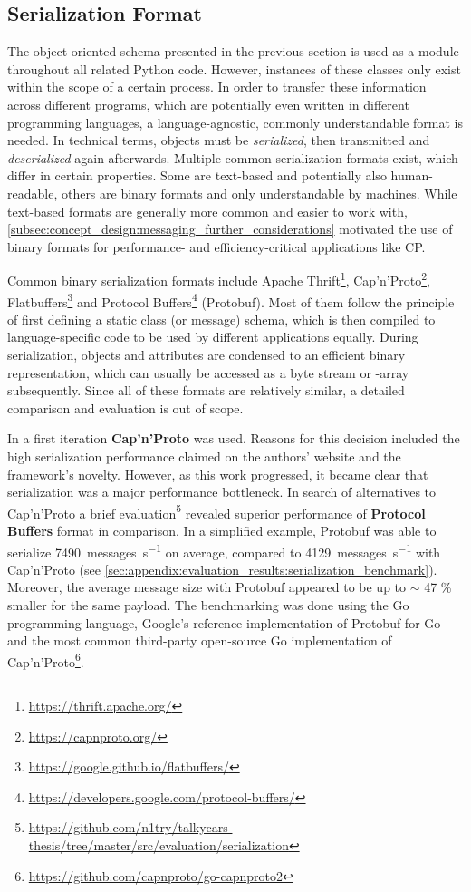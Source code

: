 \subsection{Serialization Format}
\label{subsec:implementation:serialization_format}
The object-oriented schema presented in the previous section is used as a module throughout all related Python code. However, instances of these classes only exist within the scope of a certain process. In order to transfer these information across different programs, which are potentially even written in different programming languages, a language-agnostic, commonly understandable format is needed. In technical terms, objects must be \textit{serialized}, then transmitted and \textit{deserialized} again afterwards. Multiple common serialization formats exist, which differ in certain properties. Some are text-based and potentially also human-readable, others are binary formats and only understandable by machines. While text-based formats are generally more common and easier to work with, \cref{subsec:concept_design:messaging_further_considerations} motivated the use of binary formats for performance- and efficiency-critical applications like CP.

Common binary serialization formats include Apache Thrift\footnote{\url{https://thrift.apache.org/}}, Cap'n'Proto\footnote{\url{https://capnproto.org/}},  Flatbuffers\footnote{\url{https://google.github.io/flatbuffers/}} and Protocol Buffers\footnote{\url{https://developers.google.com/protocol-buffers/}} (Protobuf). Most of them follow the principle of first defining a static class (or message) schema, which is then compiled to language-specific code to be used by different applications equally. During serialization, objects and attributes are condensed to an efficient binary representation, which can usually be accessed as a byte stream or -array subsequently. Since all of these formats are relatively similar, a detailed comparison and evaluation is out of scope.

In a first iteration \textbf{Cap'n'Proto} was used. Reasons for this decision included the high serialization performance claimed on the authors' website and the framework's novelty. However, as this work progressed, it became clear that serialization was a major performance bottleneck. In search of alternatives to Cap'n'Proto a brief evaluation\footnote{\url{https://github.com/n1try/talkycars-thesis/tree/master/src/evaluation/serialization}} revealed superior performance of \textbf{Protocol Buffers} format in comparison. In a simplified example, Protobuf was able to serialize \SI{7490}{messages\per\second} on average, compared to \SI{4129}{messages\per\second} with Cap'n'Proto (see \cref{sec:appendix:evaluation_results:serialization_benchmark}). Moreover, the average message size with Protobuf appeared to be up to $\sim$ 47 \% smaller for the same payload. The benchmarking was done using the Go programming language, Google's reference implementation of Protobuf for Go and the most common third-party open-source Go implementation of Cap'n'Proto\footnote{\url{https://github.com/capnproto/go-capnproto2}}. 

